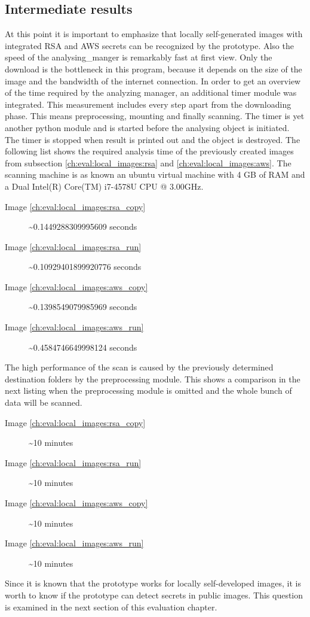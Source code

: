\subsection{Intermediate results}
At this point it is important to emphasize that locally self-generated images with integrated RSA and AWS secrets can be recognized by the prototype. Also the speed of the analysing\_manger is remarkably fast at first view. 
Only the download is the bottleneck in this program, because it depends on the size of the image and the bandwidth of the internet connection. In order to get an overview of the time required by the analyzing manager, an additional timer module was integrated. This measurement includes every step apart from the downloading phase. This means preprocessing, mounting and finally scanning.
The timer is yet another python module and is started before the analysing object is initiated. The timer is stopped when result is printed out and the object is destroyed.
The following list shows the required analysis time of the previously created images from subsection \ref{ch:eval:local_images:rsa} and \ref{ch:eval:local_images:aws}. The scanning machine is as known an ubuntu virtual machine with 4 GB of RAM and a Dual Intel(R) Core(TM) i7-4578U CPU @ 3.00GHz.

\begin{description}
\item [Image \ref{ch:eval:local_images:rsa_copy}] \textasciitilde 0.1449288309995609 seconds
\item [Image \ref{ch:eval:local_images:rsa_run}] \textasciitilde 0.10929401899920776 seconds
\item [Image \ref{ch:eval:local_images:aws_copy}] \textasciitilde 0.1398549079985969 seconds
\item [Image \ref{ch:eval:local_images:aws_run}] \textasciitilde 0.4584746649998124 seconds
\end{description}
The high performance of the scan is caused by the previously determined destination folders by the preprocessing module. This shows a comparison in the next listing when the preprocessing module is omitted and the whole bunch of data will be scanned.
\begin{description}
\item [Image \ref{ch:eval:local_images:rsa_copy}] \textasciitilde 10 minutes
\item [Image \ref{ch:eval:local_images:rsa_run}] \textasciitilde 10 minutes
\item [Image \ref{ch:eval:local_images:aws_copy}] \textasciitilde 10 minutes
\item [Image \ref{ch:eval:local_images:aws_run}] \textasciitilde 10 minutes
\end{description}

Since it is known that the prototype works for locally self-developed images, it is worth to know if the prototype can detect secrets in public images.
This question is examined in the next section of this evaluation chapter.